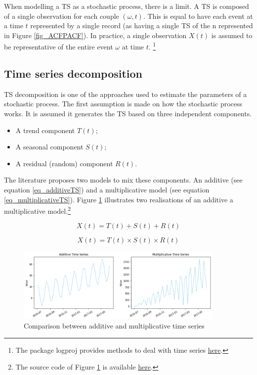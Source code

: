 When modelling a TS as a stochastic process, there is a limit. A TS is composed of a single observation for each couple $(\omega,t)$. This is equal to have each event at a time $t$ represented by a single record (as having a single TS of the n represented in Figure \ref{fig_ACFPACF}). In practice, a single observation $X(t)$ is assumed to be representative of the entire event $\omega$ at time $t$. \footnote{The package logproj provides methods to deal with time series \href{https://github.com/aletuf93/logproj/blob/master/logproj/stat_time_series.py}{here}.
}

\subsection{Time series decomposition} \label{secTimeSeriesDecomposition}
TS decomposition is one of the approaches used to estimate the parameters of a stochastic process. The first assumption is made on how the stochastic process works. It is assumed it generates the TS based on three independent components.
\begin{itemize}
    \item A trend component $T(t)$;
    \item A seasonal component $S(t)$;
    \item A residual (random) component $R(t)$.
\end{itemize}

The literature proposes two models to mix these components. An additive (see equation \ref{eq_additiveTS}) and a multiplicative model (see equation \ref{eq_multiplicativeTS}). Figure \ref{fig_addMulTS} illustrates two realisations of an additive a multiplicative model.\footnote{The source code of Figure \ref{fig_addMulTS} is available \href{https://github.com/aletuf93/logproj/blob/master/examples/03.\%20Statistics.ipynb}{here}.}

\begin{equation}
X\left(t\right)=T\left(t\right)+S\left(t\right)+R(t)
\label{eq_additiveTS}
\end{equation}

\begin{equation}
X\left(t\right)=T\left(t\right)\times S\left(t\right)\times R(t)
\label{eq_multiplicativeTS}
\end{equation}

\begin{figure}[hbt!]
\centering
\includegraphics[width=0.9\textwidth]{SectionLetsMath/elemStat_figures/fig_addMulTS.png}
\captionsetup{type=figure}
\caption{Comparison between additive and multiplicative time series}
\label{fig_addMulTS}
\end{figure}

